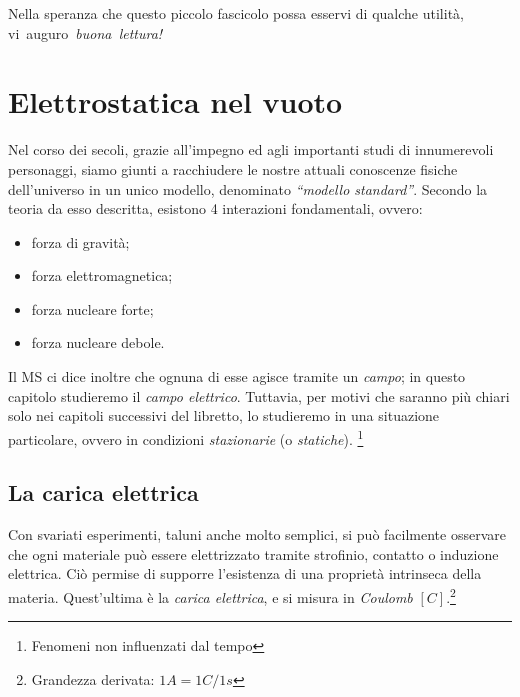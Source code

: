 \documentclass[a4paper,12pt,titlepage,openany]{book}
\theoremstyle{mydef}
\begin{document}
        \bigskip
        \begin{center}
            Nella speranza che questo piccolo fascicolo possa esservi di qualche utilità,
            vi~auguro~\emph{buona~lettura!}
        \end{center}


    \mainmatter
    \pagestyle{fancy}
    \chapter{Elettrostatica nel vuoto}
        Nel corso dei secoli, grazie all'impegno ed agli importanti studi di innumerevoli personaggi,
        siamo giunti a racchiudere le nostre attuali conoscenze fisiche dell'universo in un unico
        modello, denominato \emph{``modello standard''}. Secondo la teoria da esso descritta,
        esistono 4 interazioni
        fondamentali, ovvero:
        \begin{itemize}
            \item forza di gravità;
            \item forza elettromagnetica;
            \item forza nucleare forte;
            \item forza nucleare debole.
        \end{itemize}
        Il MS ci dice inoltre che ognuna di esse agisce tramite un \emph{campo}; in questo capitolo studieremo
        il \emph{campo elettrico}. Tuttavia, per motivi che saranno più chiari solo nei capitoli successivi del libretto, lo studieremo in una situazione particolare, ovvero in condizioni \emph{stazionarie} (o \emph{statiche}).
        \footnote{Fenomeni non influenzati dal tempo}
        
        \section{La carica elettrica}
            Con svariati esperimenti, taluni anche molto semplici, si può facilmente osservare che ogni materiale
            può essere elettrizzato tramite strofinio, contatto o induzione elettrica. Ciò permise di supporre
            l'esistenza di una proprietà intrinseca della materia. Quest'ultima è la \emph{carica elettrica},
            e si misura in \emph{Coulomb} $[C]$.\footnote{Grandezza derivata: $1A=1C/1s$}
            
\end{document}
